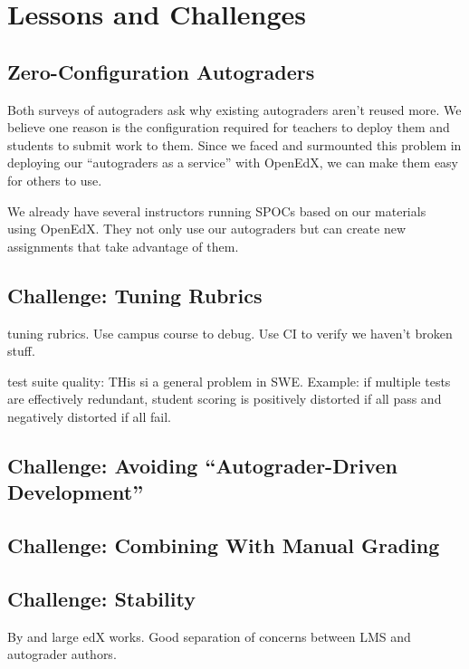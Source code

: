 \section{Lessons and Challenges}


\subsection{Zero-Configuration Autograders}

Both  surveys of autograders ask why existing autograders aren't reused more.
We believe one reason is the configuration required for teachers to deploy them and
students to submit work to them.  Since we
faced and surmounted this problem in deploying our ``autograders as a
service'' with OpenEdX, we can make them easy for others to use.


We already have several instructors running SPOCs based on our
materials~\cite{moocs-spocs-TR} using OpenEdX.  They not only use our
autograders but can create new assignments that take advantage of them.


\subsection{Challenge: Tuning Rubrics}

tuning rubrics. Use campus course to debug. Use CI to
verify we haven't broken stuff.

test suite quality: THis si a general problem in SWE. Example: if multiple tests are effectively redundant, student scoring is positively distorted if all pass and negatively distorted if all fail.


\subsection{Challenge: Avoiding ``Autograder-Driven Development''}

\subsection{Challenge: Combining With Manual Grading}



\subsection{Challenge: Stability}

By and large edX works.  Good separation
of concerns between LMS and autograder authors.




